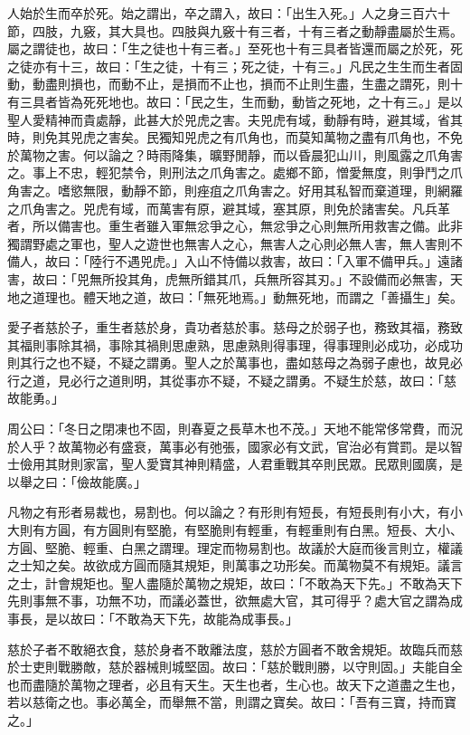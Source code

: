 \begin{pinyinscope}
人始於生而卒於死。始之謂出，卒之謂入，故曰：「出生入死。」人之身三百六十節，四肢，九竅，其大具也。四肢與九竅十有三者，十有三者之動靜盡屬於生焉。屬之謂徒也，故曰：「生之徒也十有三者。」至死也十有三具者皆還而屬之於死，死之徒亦有十三，故曰：「生之徒，十有三；死之徒，十有三。」凡民之生生而生者固動，動盡則損也，而動不止，是損而不止也，損而不止則生盡，生盡之謂死，則十有三具者皆為死死地也。故曰：「民之生，生而動，動皆之死地，之十有三。」是以聖人愛精神而貴處靜，此甚大於兕虎之害。夫兕虎有域，動靜有時，避其域，省其時，則免其兕虎之害矣。民獨知兕虎之有爪角也，而莫知萬物之盡有爪角也，不免於萬物之害。何以論之？時雨降集，曠野閒靜，而以昏晨犯山川，則風露之爪角害之。事上不忠，輕犯禁令，則刑法之爪角害之。處鄉不節，憎愛無度，則爭鬥之爪角害之。嗜慾無限，動靜不節，則痤疽之爪角害之。好用其私智而棄道理，則網羅之爪角害之。兕虎有域，而萬害有原，避其域，塞其原，則免於諸害矣。凡兵革者，所以備害也。重生者雖入軍無忿爭之心，無忿爭之心則無所用救害之備。此非獨謂野處之軍也，聖人之遊世也無害人之心，無害人之心則必無人害，無人害則不備人，故曰：「陸行不遇兕虎。」入山不恃備以救害，故曰：「入軍不備甲兵。」遠諸害，故曰：「兕無所投其角，虎無所錯其爪，兵無所容其刃。」不設備而必無害，天地之道理也。體天地之道，故曰：「無死地焉。」動無死地，而謂之「善攝生」矣。

愛子者慈於子，重生者慈於身，貴功者慈於事。慈母之於弱子也，務致其福，務致其福則事除其禍，事除其禍則思慮熟，思慮熟則得事理，得事理則必成功，必成功則其行之也不疑，不疑之謂勇。聖人之於萬事也，盡如慈母之為弱子慮也，故見必行之道，見必行之道則明，其從事亦不疑，不疑之謂勇。不疑生於慈，故曰：「慈故能勇。」

周公曰：「冬日之閉凍也不固，則春夏之長草木也不茂。」天地不能常侈常費，而況於人乎？故萬物必有盛衰，萬事必有弛張，國家必有文武，官治必有賞罰。是以智士儉用其財則家富，聖人愛寶其神則精盛，人君重戰其卒則民眾。民眾則國廣，是以舉之曰：「儉故能廣。」

凡物之有形者易裁也，易割也。何以論之？有形則有短長，有短長則有小大，有小大則有方圓，有方圓則有堅脆，有堅脆則有輕重，有輕重則有白黑。短長、大小、方圓、堅脆、輕重、白黑之謂理。理定而物易割也。故議於大庭而後言則立，權議之士知之矣。故欲成方圓而隨其規矩，則萬事之功形矣。而萬物莫不有規矩。議言之士，計會規矩也。聖人盡隨於萬物之規矩，故曰：「不敢為天下先。」不敢為天下先則事無不事，功無不功，而議必蓋世，欲無處大官，其可得乎？處大官之謂為成事長，是以故曰：「不敢為天下先，故能為成事長。」

慈於子者不敢絕衣食，慈於身者不敢離法度，慈於方圓者不敢舍規矩。故臨兵而慈於士吏則戰勝敵，慈於器械則城堅固。故曰：「慈於戰則勝，以守則固。」夫能自全也而盡隨於萬物之理者，必且有天生。天生也者，生心也。故天下之道盡之生也，若以慈衛之也。事必萬全，而舉無不當，則謂之寶矣。故曰：「吾有三寶，持而寶之。」


\end{pinyinscope}
